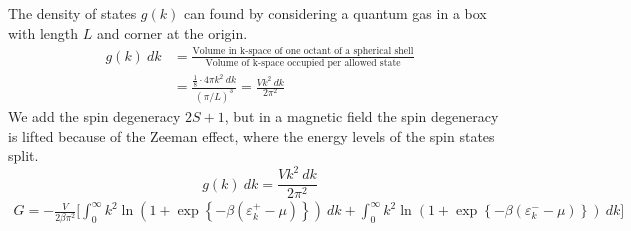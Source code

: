 \documentclass{article}
\begin{document}
\begin{enumerate}
		The density of states $g(k)$ can found by considering a quantum gas in a box with length $L$ and corner at the origin.
		\begin{align}
			g(k) \ dk &= \frac{\text{Volume in k-space of one octant of a spherical shell}}{\text{Volume of k-space occupied per allowed state}} \\
			&= \frac{\frac{1}{8} \cdot 4\pi k^2 \ dk}{(\pi/L)^3} = \frac{V k^2 \ dk}{2\pi^2}
		\end{align}
		We add the spin degeneracy $2S+1$, but in a magnetic field the spin degeneracy is lifted because of the Zeeman effect, where the energy levels of the spin states split.
		\begin{equation}
			g(k) \ dk = \frac{V k^2 \ dk}{2\pi^2}
		\end{equation}
		\begin{align}
			G = -\frac{V}{2\beta\pi^2} \biggl[ \int_0^\infty k^2 \ln\left( 1 + \exp\left\{ -\beta \left( \varepsilon_k^+ - \mu \right) \right\} \right) \ dk + \int_0^\infty k^2 \ln\left( 1 + \exp\left\{ -\beta \left( \varepsilon_k^- - \mu \right) \right\} \right) \ dk \biggr]

\end{align}
\end{enumerate}
\end{document}
